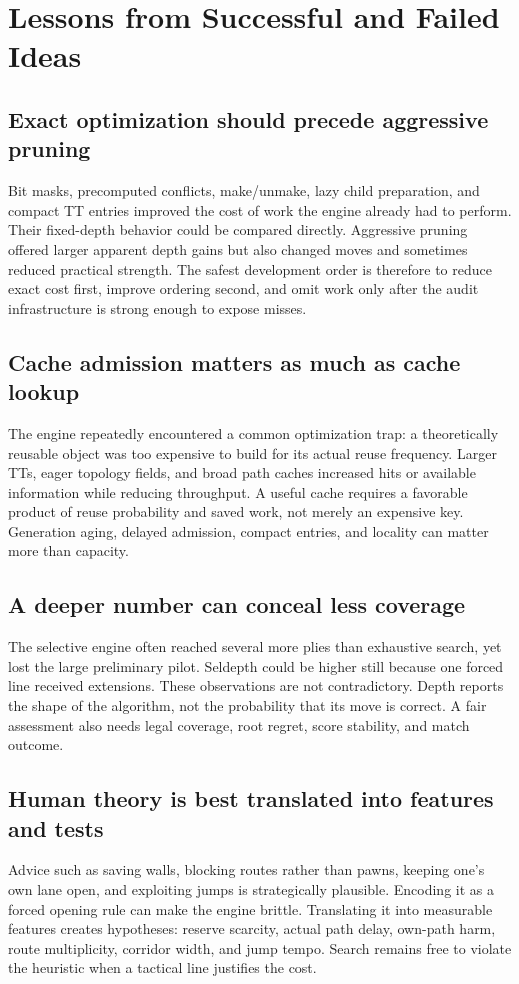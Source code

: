 \section{Lessons from Successful and Failed Ideas}
\subsection{Exact optimization should precede aggressive pruning}
Bit masks, precomputed conflicts, make/unmake, lazy child preparation, and compact TT entries improved the cost of work the engine already had to perform. Their fixed-depth behavior could be compared directly. Aggressive pruning offered larger apparent depth gains but also changed moves and sometimes reduced practical strength. The safest development order is therefore to reduce exact cost first, improve ordering second, and omit work only after the audit infrastructure is strong enough to expose misses.

\subsection{Cache admission matters as much as cache lookup}
The engine repeatedly encountered a common optimization trap: a theoretically reusable object was too expensive to build for its actual reuse frequency. Larger TTs, eager topology fields, and broad path caches increased hits or available information while reducing throughput. A useful cache requires a favorable product of reuse probability and saved work, not merely an expensive key. Generation aging, delayed admission, compact entries, and locality can matter more than capacity.

\subsection{A deeper number can conceal less coverage}
The selective engine often reached several more plies than exhaustive search, yet lost the large preliminary pilot. Seldepth could be higher still because one forced line received extensions. These observations are not contradictory. Depth reports the shape of the algorithm, not the probability that its move is correct. A fair assessment also needs legal coverage, root regret, score stability, and match outcome.

\subsection{Human theory is best translated into features and tests}
Advice such as saving walls, blocking routes rather than pawns, keeping one's own lane open, and exploiting jumps is strategically plausible. Encoding it as a forced opening rule can make the engine brittle. Translating it into measurable features creates hypotheses: reserve scarcity, actual path delay, own-path harm, route multiplicity, corridor width, and jump tempo. Search remains free to violate the heuristic when a tactical line justifies the cost.

